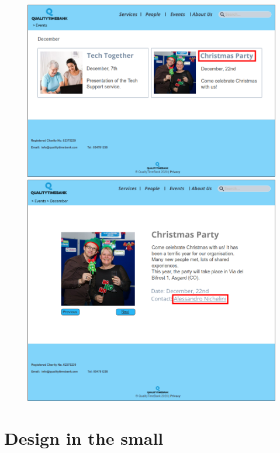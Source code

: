 \documentclass[a4paper, 11pt, parskip=half, headsepline]{scrreprt}
\begin{document}
\begin{figure}[H]
    \begin{minipage}[t]{0.5\textwidth}
        \centering
    	\includegraphics[width=0.9\linewidth, keepaspectratio]{scenarios/scenario-33}
    	\caption{}
    	\label{fig:scenario-33}
    \end{minipage}
    \hspace*{\fill}
    \begin{minipage}[t]{0.5\textwidth}
        \centering
    	\includegraphics[width=0.8\linewidth, keepaspectratio]{scenarios/scenario-34}
    	\caption{}
    	\label{fig:scenario-34}
    \end{minipage}
\end{figure}

\chapter{Design in the small}
\end{document}
